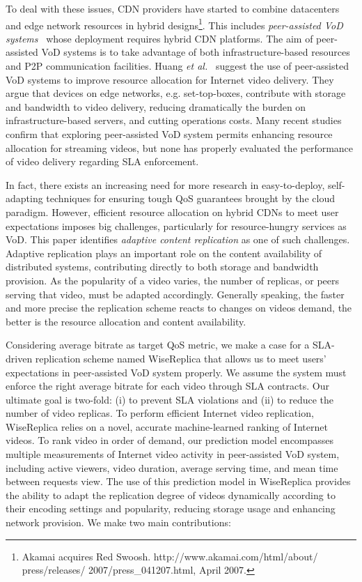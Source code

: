 To deal with these issues, CDN providers have started to combine
datacenters and edge network resources in hybrid
designs\footnote{Akamai acquires Red
  Swoosh. http://www.akamai.com/html/about/ press/releases/
  2007/press\_041207.html, April 2007.}. This includes
\emph{peer-assisted VoD systems}~\cite{profitable_vod_sigcomm_07}
whose deployment requires hybrid CDN platforms. The aim of
peer-assisted VoD systems is to take advantage of both
infrastructure-based resources and P2P communication facilities. Huang
\emph{et al.}~\cite{profitable_vod_sigcomm_07} suggest the use of
peer-assisted VoD systems to improve resource allocation for Internet video delivery. They argue that devices on edge networks, e.g. set-top-boxes, contribute with storage and bandwidth to video delivery, reducing dramatically the burden on infrastructure-based servers, and cutting operations costs. Many recent studies~\cite{parvez_bittorrent_analysis_sigmetrics08,huang2008challenges_sigcomm08,pavod_icnp12} confirm that exploring peer-assisted VoD system permits enhancing resource allocation for streaming videos, but none has properly evaluated the performance of video delivery regarding SLA enforcement. 

In fact, there exists an increasing need for more research in easy-to-deploy, self-adapting techniques for ensuring tough QoS guarantees brought by the cloud paradigm. However, efficient resource allocation on hybrid CDNs to meet user expectations imposes big challenges, particularly for resource-hungry services as VoD. 
This paper identifies \emph{adaptive content replication} as one of such challenges. Adaptive replication plays an important role on the content availability of distributed systems, contributing directly to both storage and bandwidth provision. As the popularity of a video varies, the number of replicas, or peers serving that video, must be adapted accordingly. Generally speaking, the faster and more precise the replication scheme reacts to changes on videos demand, the better is the resource allocation and content availability. 

Considering average bitrate as target QoS metric, we make a case for a
SLA-driven replication scheme named WiseReplica that allows us to meet
users' expectations in peer-assisted VoD system properly. We assume
the system must enforce the right average bitrate for each video
through SLA contracts. Our ultimate goal is two-fold: (i) to prevent
SLA violations and (ii) to reduce the number of video replicas. To
perform efficient Internet video replication, WiseReplica relies on a
novel, accurate machine-learned ranking of Internet videos. To rank
video in order of demand,  our prediction model encompasses multiple
measurements of Internet video activity in peer-assisted VoD system,
including active viewers, video duration, average serving time, and
mean time between requests view. The use of this prediction model in
WiseReplica provides the ability to adapt the replication degree of videos dynamically according to their encoding settings and popularity, reducing storage usage and enhancing network provision.  We make two main contributions:

